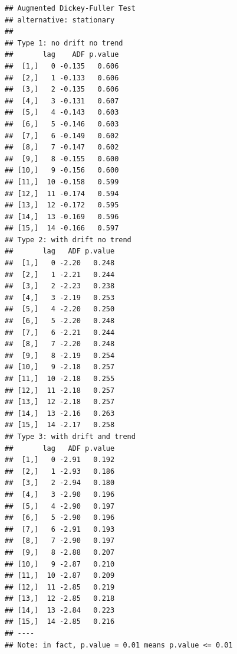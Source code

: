 \documentclass[
]{book}
\begin{document}
\begin{verbatim}
## Augmented Dickey-Fuller Test 
## alternative: stationary 
##  
## Type 1: no drift no trend 
##       lag    ADF p.value
##  [1,]   0 -0.135   0.606
##  [2,]   1 -0.133   0.606
##  [3,]   2 -0.135   0.606
##  [4,]   3 -0.131   0.607
##  [5,]   4 -0.143   0.603
##  [6,]   5 -0.146   0.603
##  [7,]   6 -0.149   0.602
##  [8,]   7 -0.147   0.602
##  [9,]   8 -0.155   0.600
## [10,]   9 -0.156   0.600
## [11,]  10 -0.158   0.599
## [12,]  11 -0.174   0.594
## [13,]  12 -0.172   0.595
## [14,]  13 -0.169   0.596
## [15,]  14 -0.166   0.597
## Type 2: with drift no trend 
##       lag   ADF p.value
##  [1,]   0 -2.20   0.248
##  [2,]   1 -2.21   0.244
##  [3,]   2 -2.23   0.238
##  [4,]   3 -2.19   0.253
##  [5,]   4 -2.20   0.250
##  [6,]   5 -2.20   0.248
##  [7,]   6 -2.21   0.244
##  [8,]   7 -2.20   0.248
##  [9,]   8 -2.19   0.254
## [10,]   9 -2.18   0.257
## [11,]  10 -2.18   0.255
## [12,]  11 -2.18   0.257
## [13,]  12 -2.18   0.257
## [14,]  13 -2.16   0.263
## [15,]  14 -2.17   0.258
## Type 3: with drift and trend 
##       lag   ADF p.value
##  [1,]   0 -2.91   0.192
##  [2,]   1 -2.93   0.186
##  [3,]   2 -2.94   0.180
##  [4,]   3 -2.90   0.196
##  [5,]   4 -2.90   0.197
##  [6,]   5 -2.90   0.196
##  [7,]   6 -2.91   0.193
##  [8,]   7 -2.90   0.197
##  [9,]   8 -2.88   0.207
## [10,]   9 -2.87   0.210
## [11,]  10 -2.87   0.209
## [12,]  11 -2.85   0.219
## [13,]  12 -2.85   0.218
## [14,]  13 -2.84   0.223
## [15,]  14 -2.85   0.216
## ---- 
## Note: in fact, p.value = 0.01 means p.value <= 0.01
\end{verbatim}
\end{document}
